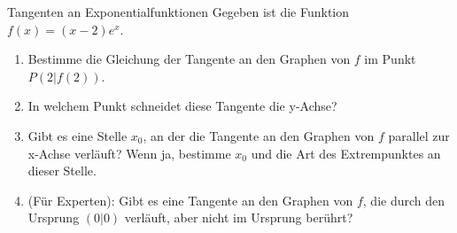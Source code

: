 \begin{aufgabenumgebung}{Tangenten an Exponentialfunktionen}
Gegeben ist die Funktion $f(x) = (x-2)e^x$.
\begin{enumerate}
    \item Bestimme die Gleichung der Tangente an den Graphen von $f$ im Punkt $P(2|f(2))$.
    \item In welchem Punkt schneidet diese Tangente die y-Achse?
    \item Gibt es eine Stelle $x_0$, an der die Tangente an den Graphen von $f$ parallel zur x-Achse verläuft? Wenn ja, bestimme $x_0$ und die Art des Extrempunktes an dieser Stelle.
    \item (Für Experten): Gibt es eine Tangente an den Graphen von $f$, die durch den Ursprung $(0|0)$ verläuft, aber nicht im Ursprung berührt?

\end{enumerate}
\end{aufgabenumgebung}


